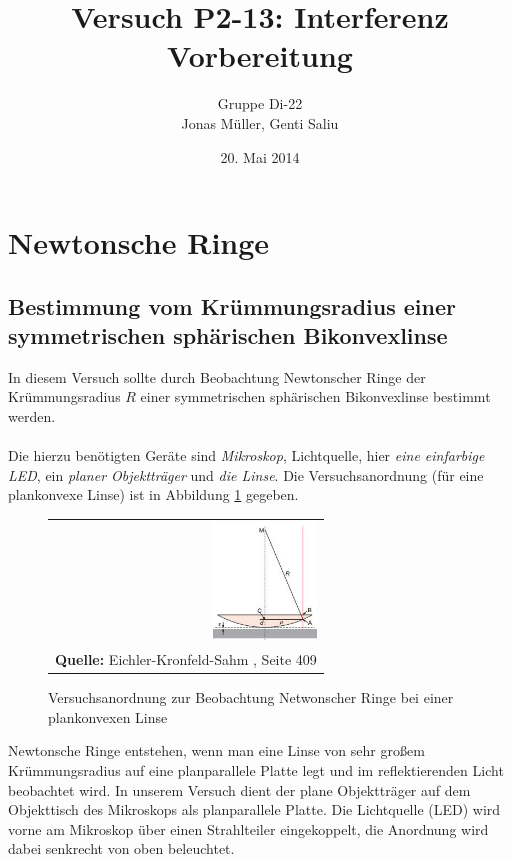 \documentclass[a4paper,titlepage]{scrartcl}
\title{Versuch P2-13: Interferenz\\Vorbereitung}
\author{Gruppe Di-22\\Jonas Müller, Genti Saliu}
\date{20. Mai 2014}
\numberwithin{equation}{section}
\begin{document}
	\begin{titlepage}
		\maketitle
		\thispagestyle{empty}
	\end{titlepage}
	
\newpage
{}
\tableofcontents

\newpage
{}

\section{Newtonsche Ringe}
\subsection{Bestimmung vom Krümmungsradius einer symmetrischen sphärischen Bikonvexlinse}
In diesem Versuch sollte durch Beobachtung Newtonscher Ringe der Krümmungsradius $R$ einer symmetrischen sphärischen Bikonvexlinse bestimmt werden.\\ \\
Die hierzu benötigten Geräte sind \emph{Mikroskop}, Lichtquelle, hier \emph{eine einfarbige LED}, ein \emph{planer Objektträger} und \emph{die Linse}. Die Versuchsanordnung (für eine plankonvexe Linse) ist in Abbildung \ref{fig:aufgabe11} gegeben.
\begin{figure}[H]
	\centering
	\begin{tabular}{@{}r@{}}
		\includegraphics[width=0.4\textwidth]{bilder/aufgabe11.JPG}\\
		\footnotesize\sffamily\textbf{Quelle:} Eichler-Kronfeld-Sahm \cite{eichler}, Seite 409
	\end{tabular}
	\caption{Versuchsanordnung zur Beobachtung Netwonscher Ringe bei einer plankonvexen Linse}
	\label{fig:aufgabe11}
\end{figure}
Newtonsche Ringe entstehen, wenn man eine Linse von sehr großem Krümmungsradius auf eine planparallele Platte legt und im reflektierenden Licht beobachtet wird. In unserem Versuch dient der plane Objektträger auf dem Objekttisch des Mikroskops als planparallele Platte. Die Lichtquelle (LED) wird vorne am Mikroskop über einen Strahlteiler eingekoppelt, die Anordnung wird dabei senkrecht von oben beleuchtet.\\ \\
\end{document}
